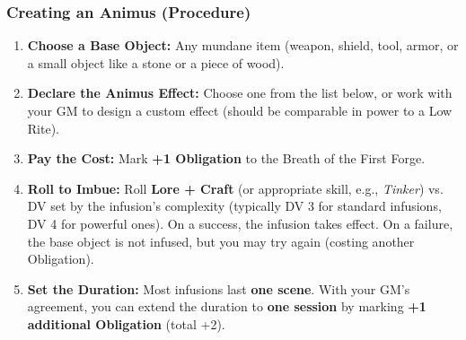\subsubsection*{Creating an Animus (Procedure)}
\begin{enumerate}
  \item \textbf{Choose a Base Object:} Any mundane item (weapon, shield, tool, armor, or a small object like a stone or a piece of wood).
  \item \textbf{Declare the Animus Effect:} Choose one from the list below, or work with your GM to design a custom effect (should be comparable in power to a Low Rite).
  \item \textbf{Pay the Cost:} Mark \textbf{+1 Obligation} to the Breath of the First Forge.
  \item \textbf{Roll to Imbue:} Roll \textbf{Lore + Craft} (or appropriate skill, e.g., \textit{Tinker}) vs. DV set by the infusion's complexity (typically DV 3 for standard infusions, DV 4 for powerful ones). On a success, the infusion takes effect. On a failure, the base object is not infused, but you may try again (costing another Obligation).
  \item \textbf{Set the Duration:} Most infusions last \textbf{one scene}. With your GM's agreement, you can extend the duration to \textbf{one session} by marking \textbf{+1 additional Obligation} (total +2).
\end{enumerate}

